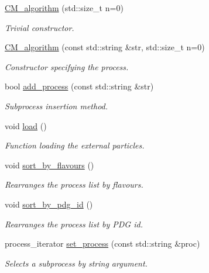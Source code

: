 \begin{DoxyCompactItemize}
\item 
\hyperlink{a00065_a3df215ba1f51f54e224f0b78736c7e73}{C\+M\+\_\+algorithm} (std\+::size\+\_\+t n=0)
\begin{DoxyCompactList}\small\item\em Trivial constructor. \end{DoxyCompactList}\item 
\hyperlink{a00065_a4a5964ae509797fb3c98012f70671220}{C\+M\+\_\+algorithm} (const std\+::string \&str, std\+::size\+\_\+t n=0)
\begin{DoxyCompactList}\small\item\em Constructor specifying the process. \end{DoxyCompactList}\item 
bool \hyperlink{a00065_aff4e8ab6eb8afce8b5dd1694b69016e4}{add\+\_\+process} (const std\+::string \&str)
\begin{DoxyCompactList}\small\item\em Subprocess insertion method. \end{DoxyCompactList}\item 
void \hyperlink{a00065_a1af7990677b4e8f265d73ab900740733}{load} ()
\begin{DoxyCompactList}\small\item\em Function loading the external particles. \end{DoxyCompactList}\item 
void \hyperlink{a00065_a1054b354b10f88755707e77d6f53f4f9}{sort\+\_\+by\+\_\+flavours} ()
\begin{DoxyCompactList}\small\item\em Rearranges the process list by flavours. \end{DoxyCompactList}\item 
void \hyperlink{a00065_abd8c0a5f195b9637e308ba6cbaa57f7f}{sort\+\_\+by\+\_\+pdg\+\_\+id} ()
\begin{DoxyCompactList}\small\item\em Rearranges the process list by P\+D\+G id. \end{DoxyCompactList}\item 
process\+\_\+iterator \hyperlink{a00065_ae36c07e3ce35f8093575b71de905117d}{set\+\_\+process} (const std\+::string \&proc)
\begin{DoxyCompactList}\small\item\em Selects a subprocess by string argument. \end{DoxyCompactList}\item 

\end{DoxyCompactItemize}
